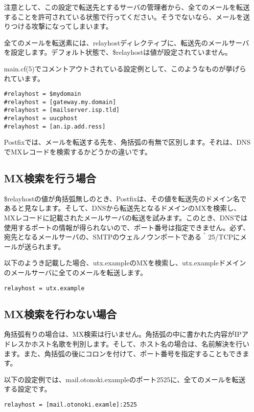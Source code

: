 {注意として、この設定で転送先とするサーバの管理者から、全てのメールを転送することを許可されている状態で行ってください。そうでないなら、メールを送りつける攻撃になってしまいます。

全てのメールを転送素には、relayhostディレクティブに、転送先のメールサーバを設定します。デフォルト状態で、\$relayhostは値が設定されていません。

main.cf(5)でコメントアウトされている設定例として、このようなものが挙げられています。

\begin{lstlisting}[basicstyle=\ttfamily\footnotesize, frame=single]
#relayhost = $mydomain
#relayhost = [gateway.my.domain]
#relayhost = [mailserver.isp.tld]
#relayhost = uucphost
#relayhost = [an.ip.add.ress]
\end{lstlisting}

Postfixでは、メールを転送する先を、角括弧の有無で区別します。それは、DNSでMXレコードを検索するかどうかの違いです。

\subsection{MX検索を行う場合}
\$relayhostの値が角括弧無しのとき、Postfixは、その値を転送先のドメイン名であると見なします。そして、DNSから転送先となるドメインのMXを検索し、MXレコードに記載されたメールサーバの転送を試みます。このとき、DNSでは使用するポートの情報が得られないので、ポート番号は指定できません。必ず、宛先となるメールサーバの、SMTPのウェルノウンポートである｀25/TCPにメールが送られます。

以下のようき記載した場合、utx.exampleのMXを検索し、utx.exampleドメインのメールサーバに全てのメールを転送します。

\begin{lstlisting}[basicstyle=\ttfamily\footnotesize, frame=single]
relayhost = utx.example
\end{lstlisting}

\subsection{MX検索を行わない場合}
角括弧有りの場合は、MX検索は行いません。角括弧の中に書かれた内容がIPアドレスかホスト名歌を判別します。そして、ホスト名の場合は、名前解決を行います。また、角括弧の後にコロンを付けて、ポート番号を指定することもできます。

以下の設定例では、mail.otonoki.exampleのポート2525に、全てのメールを転送する設定です。

\begin{lstlisting}[basicstyle=\ttfamily\footnotesize, frame=single]
relayhost = [mail.otonoki.examle]:2525
\end{lstlisting}

}
